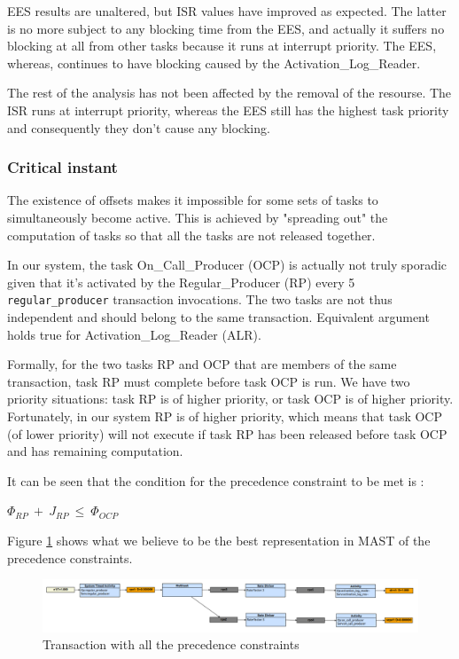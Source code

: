 \documentclass{article}
\begin{document}
EES results are unaltered, but ISR values have improved as expected. The latter is no more subject to any blocking time from the EES, and actually it suffers no blocking at all from other tasks because it runs at interrupt priority. The EES, whereas, continues to have blocking caused by the Activation\_Log\_Reader.

The rest of the analysis has not been affected by the removal of the resourse. The ISR runs at interrupt priority, whereas the EES still has the highest task priority and consequently they don't cause any blocking.

\subsubsection{Critical instant}

The existence of offsets makes it impossible for some sets of tasks to simultaneously become active. This is achieved by "spreading out" the computation of tasks so that all the tasks are not released together.

In our system, the task On\_Call\_Producer (OCP) is actually not truly sporadic given that it's activated by the Regular\_Producer (RP) every 5 \texttt{regular\_producer} transaction invocations. The two tasks are not thus independent and should belong to the same transaction. Equivalent argument holds true for Activation\_Log\_Reader (ALR).

Formally, for the two tasks RP and OCP that are members of the same transaction, task RP must complete before task OCP is run. We have two priority situations: task RP is of higher priority, or task OCP is of higher priority. Fortunately, in our system RP is of higher priority, which means that task OCP (of lower priority) will not execute if task RP has been released before task OCP and has remaining computation.

It can be seen that the condition for the precedence constraint to be met is \cite{tindell-offsets}:

$\Phi_{RP}\ +\ J_{RP}\ \le\ \Phi_{OCP}$

Figure \ref{transaction-multicast} shows what we believe to be the best representation in MAST of the precedence constraints.

\begin{figure}[!htbp]
\centering
\includegraphics[width=5in]{images/transaction-multicast}
\caption{Transaction with all the precedence constraints}
\label{transaction-multicast}
\end{figure}
\end{document}
